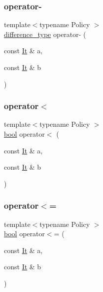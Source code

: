\subsubsection{\texorpdfstring{operator-\/}{operator-}\hspace{0.1cm}{\footnotesize\ttfamily [2/2]}}
{\footnotesize\ttfamily template$<$typename Policy $>$ \\
\mbox{\hyperlink{classgeneric__iterator_a307cd6eddc16127eb873d76bcfc07233}{difference\+\_\+type}} operator-\/ (\begin{DoxyParamCaption}\item[{const \mbox{\hyperlink{classgeneric__iterator}{It}} \&}]{a,  }\item[{const \mbox{\hyperlink{classgeneric__iterator}{It}} \&}]{b }\end{DoxyParamCaption})\hspace{0.3cm}{\ttfamily [friend]}}

\mbox{\label{classgeneric__iterator_a1ba57b963ed90488609924525018c0ba}} 
\subsubsection{\texorpdfstring{operator$<$}{operator<}}
{\footnotesize\ttfamily template$<$typename Policy $>$ \\
\mbox{\hyperlink{asdl_8h_af6a258d8f3ee5206d682d799316314b1}{bool}} operator$<$ (\begin{DoxyParamCaption}\item[{const \mbox{\hyperlink{classgeneric__iterator}{It}} \&}]{a,  }\item[{const \mbox{\hyperlink{classgeneric__iterator}{It}} \&}]{b }\end{DoxyParamCaption})\hspace{0.3cm}{\ttfamily [friend]}}

\mbox{\label{classgeneric__iterator_a1fb0728d300b006b90032e11e3aafe76}} 
\subsubsection{\texorpdfstring{operator$<$=}{operator<=}}
{\footnotesize\ttfamily template$<$typename Policy $>$ \\
\mbox{\hyperlink{asdl_8h_af6a258d8f3ee5206d682d799316314b1}{bool}} operator$<$= (\begin{DoxyParamCaption}\item[{const \mbox{\hyperlink{classgeneric__iterator}{It}} \&}]{a,  }\item[{const \mbox{\hyperlink{classgeneric__iterator}{It}} \&}]{b }\end{DoxyParamCaption})\hspace{0.3cm}{\ttfamily [friend]}}

